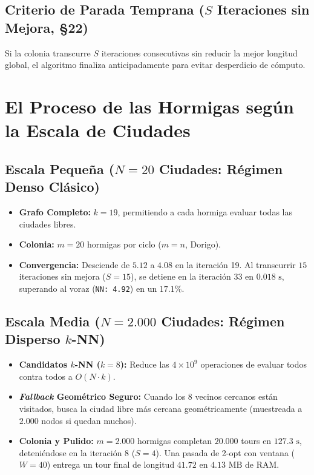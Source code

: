 \documentclass[11pt,a4paper]{article}
\begin{document}
\subsection{Criterio de Parada Temprana (\texorpdfstring{$S$}{S} Iteraciones sin Mejora, §22)}
Si la colonia transcurre $S$ iteraciones consecutivas sin reducir la mejor longitud global, el algoritmo finaliza anticipadamente para evitar desperdicio de cómputo.

\section{El Proceso de las Hormigas según la Escala de Ciudades}

\subsection{Escala Pequeña (\texorpdfstring{$N = 20$}{N = 20} Ciudades: Régimen Denso Clásico)}
\begin{itemize}
    \item \textbf{Grafo Completo:} $k = 19$, permitiendo a cada hormiga evaluar todas las ciudades libres.
    \item \textbf{Colonia:} $m = 20$ hormigas por ciclo ($m=n$, Dorigo).
    \item \textbf{Convergencia:} Desciende de $5.12$ a $4.08$ en la iteración 19. Al transcurrir $15$ iteraciones sin mejora ($S=15$), se detiene en la iteración 33 en $0.018\text{ s}$, superando al voraz (\texttt{NN: 4.92}) en un $17.1\%$.
\end{itemize}

\subsection{Escala Media (\texorpdfstring{$N = 2.000$}{N = 2000} Ciudades: Régimen Disperso \texorpdfstring{$k$-NN}{k-NN})}
\begin{itemize}
    \item \textbf{Candidatos $k$-NN ($k=8$):} Reduce las $4 \times 10^9$ operaciones de evaluar todos contra todos a $O(N \cdot k)$.
    \item \textbf{\emph{Fallback} Geométrico Seguro:} Cuando los $8$ vecinos cercanos están visitados, busca la ciudad libre más cercana geométricamente (muestreada a $2.000$ nodos si quedan muchos).
    \item \textbf{Colonia y Pulido:} $m = 2.000$ hormigas completan $20.000$ tours en $127.3\text{ s}$, deteniéndose en la iteración 8 ($S=4$). Una pasada de 2-opt con ventana ($W=40$) entrega un tour final de longitud $41.72$ en $4.13\text{ MB}$ de RAM.
\end{itemize}
\end{document}
